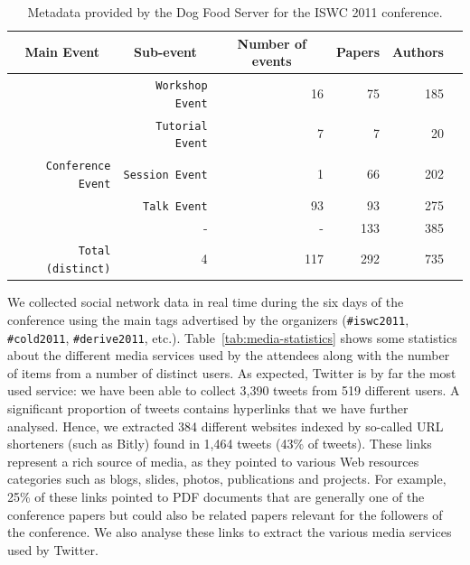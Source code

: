 \begin{table}[htbp]
\footnotesize{
\begin{center}
\begin{tabular}{|r|r|r|r|r|r|}
\hline
\multicolumn{1}{|c}{\textbf{Main Event}} & \multicolumn{1}{|c}{\textbf{Sub-event}} & \multicolumn{1}{|c}{\textbf{Number of events}} & \multicolumn{1}{|c}{\textbf{Papers}} & \multicolumn{1}{|c|}{\textbf{Authors}}\\
\hline
& \texttt{Workshop Event} & 16 & 75 & 185\\
& \texttt{Tutorial Event} & 7 & 7 & 20\\
\texttt{Conference Event} & \texttt{Session Event} & 1 & 66 & 202\\
& \texttt{Talk Event} & 93 & 93 & 275\\
& - & - & 133 & 385\\
\hline
\texttt{Total (distinct)} & 4 & 117  & 292 & 735 \\
\hline
\end{tabular}
\vspace{1mm}
\caption{Metadata provided by the Dog Food Server for the ISWC 2011 conference.}
\label{tab:dataset-stats}
\end{center}}
\end{table}


We collected social network data in real time during the six days of the conference using the main tags advertised by the organizers (\texttt{\#iswc2011}, \texttt{\#cold2011}, \texttt{\#derive2011}, etc.). Table~\ref{tab:media-statistics} shows some statistics about the different media services used by the attendees along with the number of items from a number of distinct users. As expected, Twitter is by far the most used service: we have been able to collect 3,390 tweets from 519 different users. A significant proportion of tweets contains hyperlinks that we have further analysed. Hence, we extracted 384 different websites indexed by so-called URL shorteners (such as Bitly) found in 1,464 tweets (43\% of tweets). These links represent a rich source of media, as they pointed to various Web resources categories such as blogs, slides, photos, publications and projects. For example, 25\% of these links pointed to PDF documents that are generally one of the conference papers but could also be related papers relevant for the followers of the conference. We also analyse these links to extract the various media services used by Twitter.

